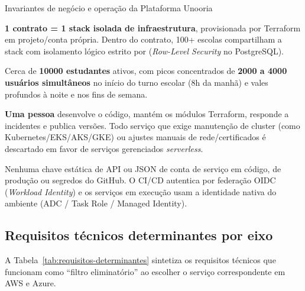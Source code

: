 \begin{fichaeixo}{Invariantes de negócio e operação da Plataforma Unooria}
\begin{campos}
  \item[Modelo B2G] \textbf{1 contrato = 1 stack isolada de infraestrutura},
    provisionada por Terraform em projeto/conta própria. Dentro do contrato,
    100+ escolas compartilham a stack com isolamento lógico estrito por
     (\emph{Row-Level Security} no PostgreSQL).
  \item[Escala por contrato] Cerca de \textbf{\num{10000} estudantes} ativos,
    com picos concentrados de \textbf{\num{2000} a \num{4000} usuários
    simultâneos} no início do turno escolar (8h da manhã) e vales profundos à
    noite e nos fins de semana.
  \item[Equipe de operação] \textbf{Uma pessoa} desenvolve o código, mantém os
    módulos Terraform, responde a incidentes e publica versões. Todo serviço que
    exige manutenção de cluster (como Kubernetes/EKS/AKS/GKE) ou ajustes manuais
    de rede/certificados é descartado em favor de serviços gerenciados
    \emph{serverless}.
  \item[Zero credenciais longas] Nenhuma chave estática de API ou JSON de conta
    de serviço em código,  de produção ou segredos do GitHub. O CI/CD
    autentica por federação OIDC (\emph{Workload Identity}) e os serviços em
    execução usam a identidade nativa do ambiente (ADC / Task Role / Managed
    Identity).
\end{campos}
\end{fichaeixo}

\subsection{Requisitos técnicos determinantes por eixo}

A Tabela~\ref{tab:requisitos-determinantes} sintetiza os requisitos técnicos que
funcionam como \enquote{filtro eliminatório} ao escolher o serviço correspondente
em AWS e Azure.

